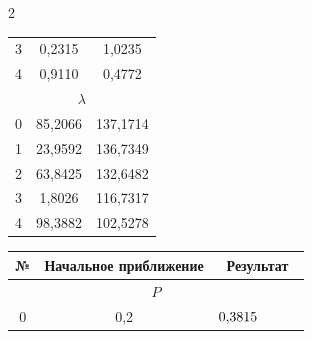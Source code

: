 \begin{multicols}{2}
\begin{table}
\begin{minipage}[t]{76mm}
\begin{center}
\begin{tabular}{|c|c|c|}
3&0,2315&1,0235\\


4&0,9110&0,4772\\


\hline


\multicolumn{3}{|c|}{$\lambda$}\\


\hline


0&85,2066&137,1714  \\


1&23,9592&136,7349\\


2&63,8425&132,6482\\


3&\hphantom{9}1,8026&116,7317\\


4&98,3882&102,5278\\


\hline


\end{tabular}


\end{center}


\end{minipage}\hfill


\begin{minipage}[t]{76mm}






\begin{center}


 \vspace*{2ex}





\tabcolsep=8.7pt


\begin{tabular}{|c|c|c|}


\hline


№&Начальное приближение&Результат\\


\hline


\multicolumn{3}{|c|}{$P$}\\


\hline


0&0,2&$0{,}3815\hphantom{{}\cdot 10^{-9}}$\\



\end{tabular}
\end{center}
\end{minipage}
\end{table}
\end{multicols}
